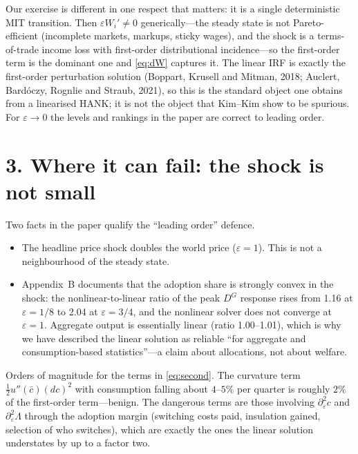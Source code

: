 \documentclass[11pt]{article}
\begin{document}
Our exercise is different in one respect that matters: it is a single deterministic MIT transition. Then $\varepsilon W_i'\neq 0$ generically---the steady state is not Pareto-efficient (incomplete markets, markups, sticky wages), and the shock is a terms-of-trade income loss with first-order distributional incidence---so the first-order term is the dominant one and \eqref{eq:dW} captures it. The linear IRF is exactly the first-order perturbation solution (Boppart, Krusell and Mitman, 2018; Auclert, Bardóczy, Rognlie and Straub, 2021), so this is the standard object one obtains from a linearised HANK; it is not the object that Kim--Kim show to be spurious. For $\varepsilon\to 0$ the levels and rankings in the paper are correct to leading order.

\section*{3. Where it can fail: the shock is not small}

Two facts in the paper qualify the ``leading order'' defence.
\begin{itemize}\itemsep2pt
\item The headline price shock doubles the world price ($\varepsilon=1$). This is not a neighbourhood of the steady state.
\item Appendix~B documents that the adoption share is strongly convex in the shock: the nonlinear-to-linear ratio of the peak $D^G$ response rises from 1.16 at $\varepsilon=1/8$ to 2.04 at $\varepsilon=3/4$, and the nonlinear solver does not converge at $\varepsilon=1$. Aggregate output is essentially linear (ratio 1.00--1.01), which is why we have described the linear solution as reliable ``for aggregate and consumption-based statistics''---a claim about allocations, not about welfare.
\end{itemize}
Orders of magnitude for the terms in \eqref{eq:second}. The curvature term $\tfrac12u''(\bar c)(dc)^2$ with consumption falling about $4$--$5\%$ per quarter is roughly $2\%$ of the first-order term---benign. The dangerous terms are those involving $\partial^2_\varepsilon c$ and $\partial^2_\varepsilon\Lambda$ through the adoption margin (switching costs paid, insulation gained, selection of who switches), which are exactly the ones the linear solution understates by up to a factor two.
\end{document}
